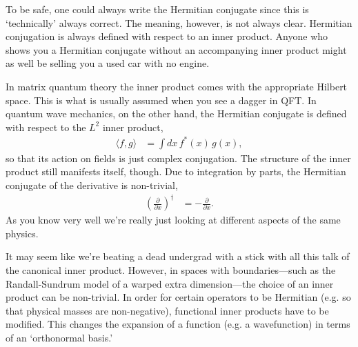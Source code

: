 \documentclass[12pt, oneside]{report}    %
\begin{document}
To be safe, one could always write the Hermitian conjugate since this is `technically' always correct. The meaning, however, is not always clear. Hermitian conjugation is always defined with respect to an inner product. Anyone who shows you a Hermitian conjugate without an accompanying inner product might as well be selling you a used car with no engine. 

In matrix quantum theory the inner product comes with the appropriate Hilbert space. This is what is usually assumed when you see a dagger in QFT. In quantum wave mechanics, on the other hand, the Hermitian conjugate is defined with respect to the $L^2$ inner product,
\begin{align}
    \langle f,g \rangle &= \int dx\, f^*(x)\,g(x),
\end{align}
so that its action on fields is just complex conjugation. The structure of the inner product still manifests itself, though. Due to integration by parts, the Hermitian conjugate of the derivative is non-trivial,
\begin{align}
    \left(\frac{\partial}{\partial x}\right)^\dag &= -\frac{\partial}{\partial x}.
\end{align}
As you know very well we're really just looking at different aspects of the same physics.
\begin{example}
It may seem like we're beating a dead undergrad with a stick with all this talk of the canonical inner product. However, in spaces with boundaries---such as the Randall-Sundrum model of a warped extra dimension---the choice of an inner product can be non-trivial. In order for certain operators to be Hermitian (e.g. so that physical masses are non-negative),  functional inner products have to be modified. This changes the expansion of a function (e.g. a wavefunction) in terms of an `orthonormal basis.'
\end{example}
\end{document}
